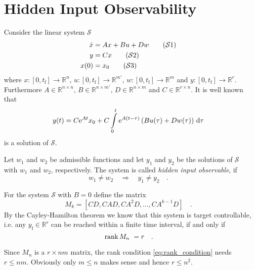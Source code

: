 \section{Hidden Input Observability}
Consider the linear system $\mathcal{S}$
\begin{align}
\dot x &= Ax + Bu +Dw \label{eq:dynamics} \tag{$\mathcal{S}1$} \\
y &= Cx \label{eq:observation} \tag{$\mathcal{S}2$} \\
x(0) &= x_0 \label{eq:initial_value}\tag{$\mathcal{S}3$}
\end{align}
where $x:[0,t_\text{f}]\to \mathbb{R}^n$, $u:[0,t_\text{f}]\to \mathbb{R}^{m'}$, 
$w:[0,t_\text{f}]\to \mathbb{R}^m$ and $y:[0,t_\text{f}]\to \mathbb{R}^r$. Furthermore 
$A\in \mathbb{R}^{n\times n}$, $B\in \mathbb{R}^{n\times m'}$, $D\in\mathbb{R}^{n\times m}$ 
and $C\in\mathbb{R}^{r\times n}$.
It is well known that
\begin{equation}
y(t) = C\text{e}^{At} x_0 + C\int\limits_0^t \text{e}^{A(t-\tau)}\left(Bu(\tau)+Dw(\tau)\right)
\,\text{d} \tau
\end{equation}
is a solution of $\mathcal{S}$.

\begin{definition}
Let $w_1$ and $w_2$ be admissible functions and let $y_1$ and $y_2$ be the solutions 
of $\mathcal{S}$ with $w_1$ and $w_2$, respectively.
The system is called \textit{hidden input observable}, if 
\begin{equation}
w_1 \neq w_2 \quad \Rightarrow \quad y_1 \neq y_2 \quad .
\end{equation}
\end{definition}

\begin{theorem} \label{theorem:target_controllability}
For the system $\mathcal{S}$ with $B=0$ define the matrix
\begin{equation}
M_k = [CD,CAD,CA^2D,\ldots,CA^{k-1}D] \quad .
\end{equation}
By the Cayley-Hamilton theorem we know that this system is target controllable, i.e. any 
$y_\text{f}\in\mathbb{R}^r$ can be reached within a finite time interval, if and only if 
\begin{equation}
 \, \text{rank}\,M_n \,\,  = r \quad . \label{eq:rank_condition}
\end{equation}
\end{theorem}

\begin{remark}
Since $M_n$ is a $r \times nm$ matrix, the rank condition \eqref{eq:rank_condition} needs 
$r \leq nm$. Obviously only $m \leq n$ makes sense and hence $r \leq n^2$.
\end{remark}


